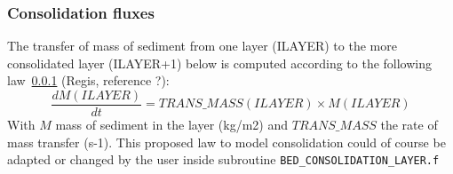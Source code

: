 \subsubsection{Consolidation fluxes}
The transfer of mass of sediment from one layer ({\ttfamily ILAYER}) to the more consolidated layer ({\ttfamily ILAYER+1}) below is computed according to the following law~\ref{} (Regis, reference ?):
\begin{equation}
  \frac{dM(ILAYER)}{dt}=TRANS\_MASS(ILAYER )\times M(ILAYER)
\end{equation}
With $M$ mass of sediment in the layer (kg/m2) and $TRANS\_MASS$ the rate of mass transfer (s-1).
This proposed law to model consolidation could of course be adapted or changed by the user inside subroutine \texttt{BED\_CONSOLIDATION\_LAYER.f}


